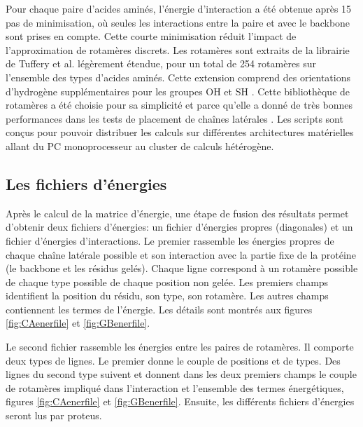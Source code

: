 Pour chaque paire d'acides aminés, l'énergie d'interaction a été obtenue après 15 pas de minimisation, où seules les interactions entre la paire et avec le backbone sont prises en compte. Cette courte minimisation réduit l'impact de l'approximation de rotamères discrets. Les rotamères sont extraits de la librairie de Tuffery et al. \cite{Tuffery91} légèrement étendue, pour un total de 254 rotamères sur l'ensemble des types d'acides aminés. Cette extension comprend des orientations d'hydrogène supplémentaires pour les groupes OH et SH \cite{Gaillard14}. Cette bibliothèque de rotamères a été choisie pour sa simplicité et parce qu'elle a donné de très bonnes performances dans les tests de placement de chaînes latérales \cite{Krivov09,Gaillard16}. Les scripts sont conçus pour pouvoir distribuer les calculs sur différentes architectures matérielles allant du PC monoprocesseur au cluster de calculs hétérogène.

\subsection{Les fichiers d'énergies}

Après le calcul de la matrice d'énergie, une étape de fusion des résultats permet d'obtenir deux fichiers d'énergies: un fichier d'énergies propres (diagonales) et un fichier d'énergies d'interactions. Le premier rassemble les énergies propres de chaque chaîne latérale possible et son interaction avec la partie fixe de la protéine (le backbone et les résidus gelés). Chaque ligne correspond à un rotamère possible de chaque type possible de chaque position non gelée. Les premiers champs identifient la position du résidu, son type, son rotamère. Les autres champs contiennent les termes de l'énergie. Les détails sont montrés aux figures \ref{fig:CAenerfile} et \ref{fig:GBenerfile}.   

Le second fichier rassemble les énergies entre les paires de rotamères. Il comporte deux types de lignes. Le premier donne le couple de positions et de types. Des lignes du second type suivent et donnent dans les deux premiers champs le couple de rotamères impliqué dans l'interaction et l'ensemble des termes énergétiques, figures \ref{fig:CAenerfile} et \ref{fig:GBenerfile}. Ensuite, les différents fichiers d'énergies seront lus par proteus. 

